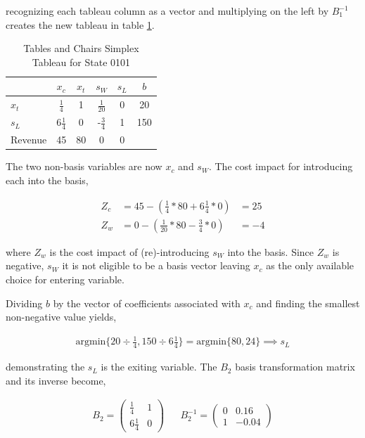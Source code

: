 recognizing each tableau column as a vector and multiplying on the left by $B_1^{-1}$ creates the new tableau in table \ref{tab:tc0101}.

\begin{table}
\centering
\begin{tabular}{| l | c c c c | c |}
\hline
        & $x_c$ & $x_t$ & $s_W$ & $s_L$ & $b$\\
\hline
$x_t$   & $\frac{1}{4}$     & 1    & $\frac{1}{20}$     & 0     & 20\\
$s_L$   & 6$\frac{1}{4}$    & 0    & -$\frac{3}{4}$     & 1     & 150\\
\hline
Revenue & 45    & 80    & 0     & 0     &\\
\hline
\end{tabular}
  \caption[Tables and Chairs Simplex Tableau for State 0101]
          {Tables and Chairs Simplex Tableau for State 0101}
  \label{tab:tc0101}
\end{table}


The two non-basis variables are now $x_c$ and $s_W$. The cost impact for introducing each into the basis,

\begin{align*}
Z_c &= 45 - (\frac{1}{4}*80 + 6\frac{1}{4}*0) &= 25\\
Z_w &= 0 - (\frac{1}{20}*80 - \frac{3}{4}*0) &= -4 
\end{align*}

where $Z_w$ is the cost impact of (re)-introducing $s_W$ into the basis. Since $Z_w$ is negative, $s_W$ it is not eligible to be a basis vector leaving $x_c$ as the only available choice for entering variable.

Dividing $b$ by the vector of coefficients associated with $x_c$ and finding the smallest non-negative value yields,

\begin{align*}
\text{argmin}\{20 \div \frac{1}{4}, 150 \div 6\frac{1}{4}\} =
\text{argmin}\{80, 24\} \implies s_L
\end{align*}

demonstrating the $s_L$ is the exiting variable. The $B_2$ basis transformation matrix and its inverse become,

\begin{align*}
B_2 = \begin{pmatrix}\frac{1}{4}&1\\6\frac{1}{4}&0\end{pmatrix} && B_2^{-1} = \begin{pmatrix}0&0.16\\1&-0.04\end{pmatrix}
\end{align*}

